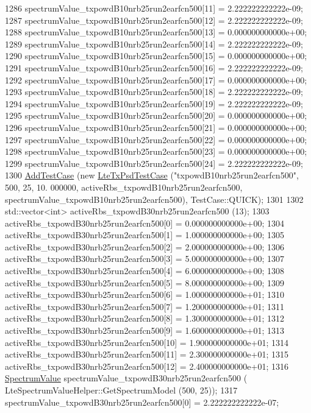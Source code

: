 \begin{DoxyCode}
1286   spectrumValue\_txpowdB10nrb25run2earfcn500[11] = 2.222222222222e-09;
1287   spectrumValue\_txpowdB10nrb25run2earfcn500[12] = 2.222222222222e-09;
1288   spectrumValue\_txpowdB10nrb25run2earfcn500[13] = 0.000000000000e+00;
1289   spectrumValue\_txpowdB10nrb25run2earfcn500[14] = 2.222222222222e-09;
1290   spectrumValue\_txpowdB10nrb25run2earfcn500[15] = 0.000000000000e+00;
1291   spectrumValue\_txpowdB10nrb25run2earfcn500[16] = 2.222222222222e-09;
1292   spectrumValue\_txpowdB10nrb25run2earfcn500[17] = 0.000000000000e+00;
1293   spectrumValue\_txpowdB10nrb25run2earfcn500[18] = 2.222222222222e-09;
1294   spectrumValue\_txpowdB10nrb25run2earfcn500[19] = 2.222222222222e-09;
1295   spectrumValue\_txpowdB10nrb25run2earfcn500[20] = 0.000000000000e+00;
1296   spectrumValue\_txpowdB10nrb25run2earfcn500[21] = 0.000000000000e+00;
1297   spectrumValue\_txpowdB10nrb25run2earfcn500[22] = 0.000000000000e+00;
1298   spectrumValue\_txpowdB10nrb25run2earfcn500[23] = 0.000000000000e+00;
1299   spectrumValue\_txpowdB10nrb25run2earfcn500[24] = 2.222222222222e-09;
1300   \hyperlink{classns3_1_1TestCase_a3718088e3eefd5d6454569d2e0ddd835}{AddTestCase} (\textcolor{keyword}{new} \hyperlink{classLteTxPsdTestCase}{LteTxPsdTestCase} (\textcolor{stringliteral}{"txpowdB10nrb25run2earfcn500"}, 500, 25, 10.
      000000, activeRbs\_txpowdB10nrb25run2earfcn500, spectrumValue\_txpowdB10nrb25run2earfcn500), TestCase::QUICK);
1301 
1302   std::vector<int> activeRbs\_txpowdB30nrb25run2earfcn500 (13);
1303   activeRbs\_txpowdB30nrb25run2earfcn500[0] = 0.000000000000e+00;
1304   activeRbs\_txpowdB30nrb25run2earfcn500[1] = 1.000000000000e+00;
1305   activeRbs\_txpowdB30nrb25run2earfcn500[2] = 2.000000000000e+00;
1306   activeRbs\_txpowdB30nrb25run2earfcn500[3] = 5.000000000000e+00;
1307   activeRbs\_txpowdB30nrb25run2earfcn500[4] = 6.000000000000e+00;
1308   activeRbs\_txpowdB30nrb25run2earfcn500[5] = 8.000000000000e+00;
1309   activeRbs\_txpowdB30nrb25run2earfcn500[6] = 1.000000000000e+01;
1310   activeRbs\_txpowdB30nrb25run2earfcn500[7] = 1.200000000000e+01;
1311   activeRbs\_txpowdB30nrb25run2earfcn500[8] = 1.300000000000e+01;
1312   activeRbs\_txpowdB30nrb25run2earfcn500[9] = 1.600000000000e+01;
1313   activeRbs\_txpowdB30nrb25run2earfcn500[10] = 1.900000000000e+01;
1314   activeRbs\_txpowdB30nrb25run2earfcn500[11] = 2.300000000000e+01;
1315   activeRbs\_txpowdB30nrb25run2earfcn500[12] = 2.400000000000e+01;
1316   \hyperlink{classns3_1_1SpectrumValue}{SpectrumValue} spectrumValue\_txpowdB30nrb25run2earfcn500 (
      LteSpectrumValueHelper::GetSpectrumModel (500, 25));
1317   spectrumValue\_txpowdB30nrb25run2earfcn500[0] = 2.222222222222e-07;

\end{DoxyCode}
